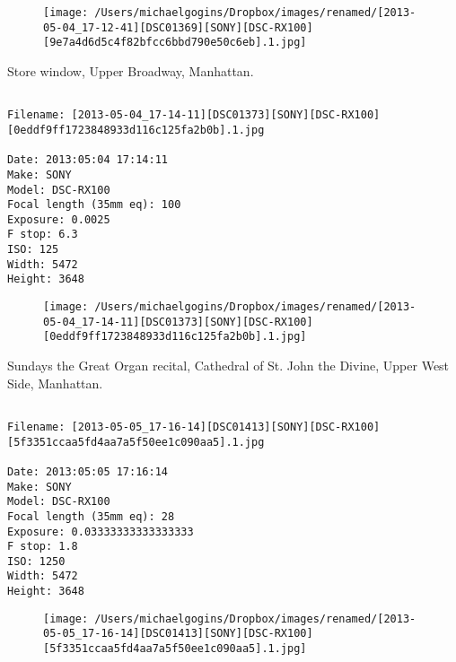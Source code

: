 \begin{figure}
\texttt{[image: /Users/michaelgogins/Dropbox/images/renamed/[2013-05-04\_17-12-41][DSC01369][SONY][DSC-RX100][9e7a4d6d5c4f82bfcc6bbd790e50c6eb].1.jpg]}
\end{figure}
    
\clearpage
\onecolumn
\noindent Store window, Upper Broadway, Manhattan.
\noindent
\begin{lstlisting}

Filename: [2013-05-04_17-14-11][DSC01373][SONY][DSC-RX100][0eddf9ff1723848933d116c125fa2b0b].1.jpg

Date: 2013:05:04 17:14:11
Make: SONY
Model: DSC-RX100
Focal length (35mm eq): 100
Exposure: 0.0025
F stop: 6.3
ISO: 125
Width: 5472
Height: 3648
\end{lstlisting}
\clearpage

\begin{figure}
\texttt{[image: /Users/michaelgogins/Dropbox/images/renamed/[2013-05-04\_17-14-11][DSC01373][SONY][DSC-RX100][0eddf9ff1723848933d116c125fa2b0b].1.jpg]}
\end{figure}
    
\clearpage
\onecolumn
\noindent Sundays the Great Organ recital, Cathedral of St. John the Divine, Upper West Side, Manhattan.
\noindent
\begin{lstlisting}

Filename: [2013-05-05_17-16-14][DSC01413][SONY][DSC-RX100][5f3351ccaa5fd4aa7a5f50ee1c090aa5].1.jpg

Date: 2013:05:05 17:16:14
Make: SONY
Model: DSC-RX100
Focal length (35mm eq): 28
Exposure: 0.03333333333333333
F stop: 1.8
ISO: 1250
Width: 5472
Height: 3648
\end{lstlisting}
\clearpage

\begin{figure}
\texttt{[image: /Users/michaelgogins/Dropbox/images/renamed/[2013-05-05\_17-16-14][DSC01413][SONY][DSC-RX100][5f3351ccaa5fd4aa7a5f50ee1c090aa5].1.jpg]}
\end{figure}
    
